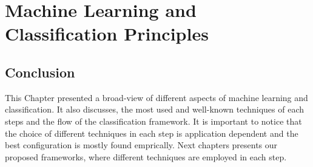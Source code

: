 \clearemptydoublepage
\acresetall
\chapter{Machine Learning and Classification Principles}
\label{chp:chapter2}







\section{Conclusion}
This Chapter presented a broad-view of different aspects of machine learning and classification.
It also discusses, the most used and well-known techniques of each steps and the flow of the classification framework.
It is important to notice that the choice of different techniques in each step is application dependent and the best configuration is mostly found emprically.
Next chapters presents our proposed frameworks, where different techniques are employed in each step.

